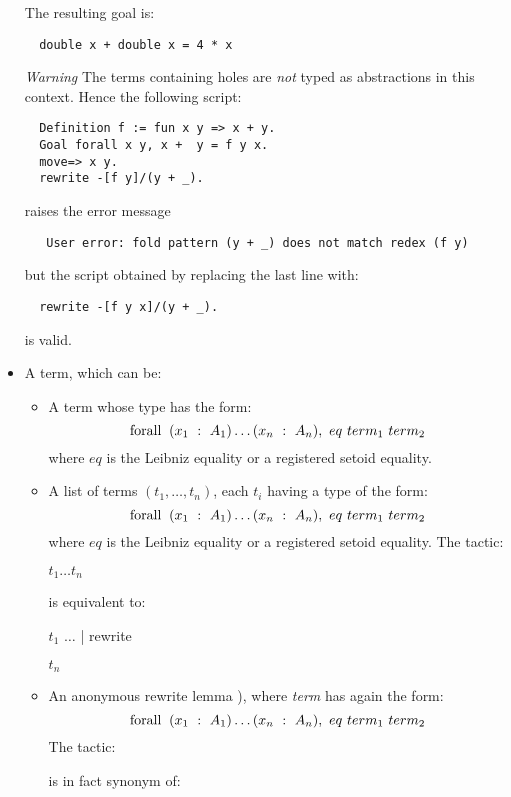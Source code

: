 \begin{itemize}
The resulting goal is:

\begin{lstlisting}
  double x + double x = 4 * x
\end{lstlisting}

\emph{Warning} The \ssr{} terms containing holes are \emph{not}
typed as abstractions in this context. Hence the following script:
\begin{lstlisting}
  Definition f := fun x y => x + y.
  Goal forall x y, x +  y = f y x.
  move=> x y.
  rewrite -[f y]/(y + _).
\end{lstlisting}
raises the error message
\begin{verbatim}
   User error: fold pattern (y + _) does not match redex (f y)
\end{verbatim}
but the script obtained by replacing the last line with:
\begin{lstlisting}
  rewrite -[f y x]/(y + _).
\end{lstlisting}
is valid.


\item A term, which can be:
  \begin{itemize}
    \item A term whose type has the form:
      $$\ssrC{forall}\ (x_1\ :\ A_1)\dots(x_n\ :\ A_n),\ eq\ term_1\ term_2$$
      where $eq$ is the Leibniz equality or a registered setoid
      equality. %
    \item A list of terms $(t_1,\dots,t_n)$, each $t_i$ having a type of the
      form: $$\ssrC{forall}\ (x_1\ :\ A_1)\dots(x_n\ :\ A_n),\ eq\ term_1\ term_2$$ where
      $eq$ is the Leibniz equality or a registered setoid
      equality. The tactic:

        \centerline{ \ssrC{(}$t_1$\ssrC{,}$\dots$\ssrC{,}$t_n$}

      is equivalent to:

  \centerline{\ssrC{do [rewrite}  $t_1$ \ssrC{|} $\dots$ \ssrC| rewrite}  $t_n$\ssrC{].}

    \item An anonymous rewrite lemma
      \ssrC{(_ :} {\term}), where \textit{term} has again the form:
      $$\ssrC{forall}\ (x_1\ :\ A_1)\dots(x_n\ :\ A_n),\ eq\ term_1\ term_2$$
      The tactic:

        \centerline{ {\term}\ssrC{)}}

      is in fact synonym of:

        \centerline{}


  \end{itemize}

\end{itemize}





